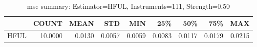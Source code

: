 \begin{table}[ht]
\centering
\caption{mse summary: Estimator=HFUL, Instruments=111, Strength=0.50}
\begin{tabular}{lrrrrrrrr}
\toprule
 & COUNT & MEAN & STD & MIN & 25\% & 50\% & 75\% & MAX \\
\midrule
HFUL & 10.0000 & 0.0130 & 0.0057 & 0.0059 & 0.0083 & 0.0117 & 0.0179 & 0.0215 \\
\bottomrule
\end{tabular}
\end{table}
